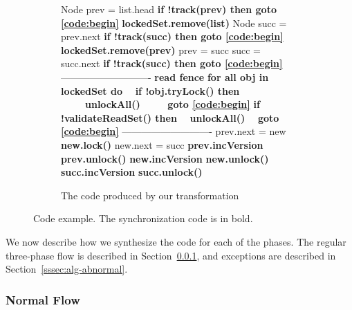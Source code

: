 \begin{figure*}
\begin{center}
\begin{subfigure}[b]{.45\textwidth}
\begin{algorithmic}[1]{}
{			\State{\spOne}Node prev = list.head
			\State{\spOne}\textbf{if !track(prev)  then {goto} \ref{code:begin}} \label{code:readGhaseGoto1}
            \State{\spOne}\textbf{lockedSet.remove(list)} \label{code:lockedSet:remove1}
			\State{\spOne}Node succ = prev.next
			\State{\spOne}\textbf{if !track(succ) then {goto} \ref{code:begin}}  \label{code:readGhaseGoto2}
			\State{\spOne}\textbf{lockedSet.remove(prev)} \label{code:lockedSet:remove2}
			\State{\spZero}prev = succ
			\State{\spZero}succ = succ.next
			\State{\spZero}\textbf{if !track(succ) then {goto} \ref{code:begin}} \label{code:readGhaseGoto3}
			\Statex ----------------------------
			\State{\spZero}\textbf{read fence} \label{code:fence}
			\State{\spZero}\textbf{for all obj in lockedSet do} \label{code:validateLockedSet}	
            \State{\spZero}\ \ \textbf{if !obj.tryLock() then}
            \State{\spZero}\ \ \ \ \ \textbf{unlockAll()}
            \State{\spZero}\ \ \ \ \ \textbf{{goto} \ref{code:begin}} \label{code:validateGoto1}
			\State{\spZero}\textbf{if !validateReadSet() then} 		\label{code:validateReadSet}
				\State{\spZero}\ \ \textbf{unlockAll()}
				\State{\spZero}\ \ \textbf{{goto} \ref{code:begin}} \label{code:validateGoto2}
			\Statex ----------------------------
			\State{\spZero}prev.next = new
			\State{\spZero}\textbf{new.lock()}
			\State{\spZero}new.next = succ			
			\State{\spZero}\textbf{prev.incVersion}
			\State{\spZero}\textbf{prev.unlock()}
			\State{\spZero}\textbf{new.incVersion}
			\State{\spZero}\textbf{new.unlock()}
			\State{\spZero}\textbf{succ.incVersion}
			\State{\spZero}\textbf{succ.unlock()}

			\EndFunction
			}
		\end{algorithmic}
		\caption{The code produced by our  transformation}\label{figure:transformation:after}
	\end{subfigure}
	\end{center}
\vspace{-4mm}
	\caption{Code example.
	The synchronization code is in bold.
			\label{figure:transformation}}
\end{figure*}

We now describe how we synthesize the code for each of the phases. The regular three-phase flow is described in
Section~\ref{sssec:alg-normal}, and exceptions are described in Section~\ref{sssec:alg-abnormal}.

\subsubsection{Normal Flow}
\label{sssec:alg-normal}

